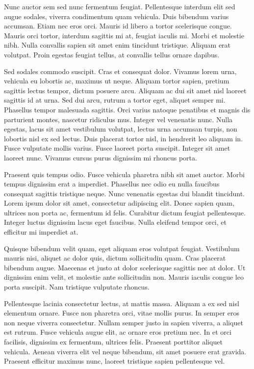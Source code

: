 \documentclass{article}
\begin{document}
Nunc auctor sem sed nunc fermentum feugiat. Pellentesque interdum elit sed augue sodales, viverra condimentum quam vehicula. Duis bibendum varius accumsan. Etiam nec eros orci. Mauris id libero a tortor scelerisque congue. Mauris orci tortor, interdum sagittis mi at, feugiat iaculis mi. Morbi et molestie nibh. Nulla convallis sapien sit amet enim tincidunt tristique. Aliquam erat volutpat. Proin egestas feugiat tellus, at convallis tellus ornare dapibus.

Sed sodales commodo suscipit. Cras et consequat dolor. Vivamus lorem urna, vehicula eu lobortis ac, maximus ut neque. Aliquam tortor sapien, pretium sagittis lectus tempor, dictum posuere arcu. Aliquam ac dui sit amet nisl laoreet sagittis id at urna. Sed dui arcu, rutrum a tortor eget, aliquet semper mi. Phasellus tempor malesuada sagittis. Orci varius natoque penatibus et magnis dis parturient montes, nascetur ridiculus mus. Integer vel venenatis nunc. Nulla egestas, lacus sit amet vestibulum volutpat, lectus urna accumsan turpis, non lobortis nisl ex sed lectus. Duis placerat tortor nisl, in hendrerit leo aliquam in. Fusce vulputate mollis varius. Fusce laoreet porta suscipit. Integer sit amet laoreet nunc. Vivamus cursus purus dignissim mi rhoncus porta.

Praesent quis tempus odio. Fusce vehicula pharetra nibh sit amet auctor. Morbi tempus dignissim erat a imperdiet. Phasellus nec odio eu nulla faucibus consequat sagittis tristique neque. Nunc venenatis egestas dui blandit tincidunt. Lorem ipsum dolor sit amet, consectetur adipiscing elit. Donec sapien quam, ultrices non porta ac, fermentum id felis. Curabitur dictum feugiat pellentesque. Integer luctus dignissim lacus eget faucibus. Nulla eleifend tempor orci, et efficitur mi imperdiet at.

Quisque bibendum velit quam, eget aliquam eros volutpat feugiat. Vestibulum mauris nisi, aliquet ac dolor quis, dictum sollicitudin quam. Cras placerat bibendum augue. Maecenas et justo at dolor scelerisque sagittis nec at dolor. Ut dignissim enim velit, et molestie ante sollicitudin non. Mauris iaculis congue leo porta suscipit. Nam tristique vulputate rhoncus.

Pellentesque lacinia consectetur lectus, at mattis massa. Aliquam a ex sed nisl elementum ornare. Fusce non pharetra orci, vitae mollis purus. In semper eros non neque viverra consectetur. Nullam semper justo in sapien viverra, a aliquet est rutrum. Fusce vehicula augue elit, ac ornare eros pretium nec. In et orci facilisis, dignissim ex fermentum, ultrices felis. Praesent porttitor aliquet vehicula. Aenean viverra elit vel neque bibendum, sit amet posuere erat gravida. Praesent efficitur maximus nunc, laoreet tristique sapien pellentesque vel.
\end{document}
